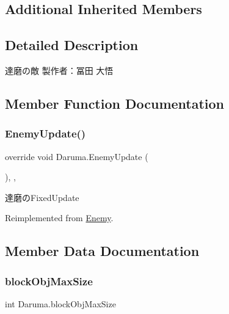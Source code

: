 \subsection*{Additional Inherited Members}


\subsection{Detailed Description}
達磨の敵 製作者：冨田 大悟 



\subsection{Member Function Documentation}
\mbox{\label{class_daruma_aacb22dfd1f65e403acf44231e308e97c}} 
\subsubsection{\texorpdfstring{Enemy\+Update()}{EnemyUpdate()}}
{\footnotesize\ttfamily override void Daruma.\+Enemy\+Update (\begin{DoxyParamCaption}{ }\end{DoxyParamCaption})\hspace{0.3cm}{\ttfamily [inline]}, {\ttfamily [protected]}, {\ttfamily [virtual]}}



達磨の\+Fixed\+Update 



Reimplemented from \hyperlink{class_enemy_ab19a73003a5b443ba93f4b6a45c0abad}{Enemy}.



\subsection{Member Data Documentation}
\mbox{\label{class_daruma_a77ede57b08f9ed6a780445675e652002}} 
\subsubsection{\texorpdfstring{block\+Obj\+Max\+Size}{blockObjMaxSize}}
{\footnotesize\ttfamily int Daruma.\+block\+Obj\+Max\+Size\hspace{0.3cm}{\ttfamily [private]}}



